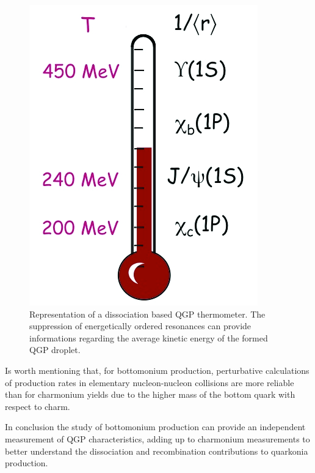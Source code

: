 

\begin{figure}[!t]
\begin{center}
\includegraphics[width=0.3\linewidth]{Chapters/Analysis/Figs/QGP_thermometer.png}
\caption{Representation of a dissociation based QGP thermometer. The suppression of energetically ordered resonances can provide informations regarding the average kinetic energy of the formed QGP droplet.}
\label{fig:QGP_thermo}
\end{center}
\end{figure}

Is worth mentioning that, for bottomonium production, perturbative calculations of production rates in elementary nucleon-nucleon collisions are more reliable than for charmonium yields due to the higher mass of the bottom quark with respect to charm. 

In conclusion the study of bottomonium production can provide an independent measurement of QGP characteristics, adding up to charmonium measurements to better understand the dissociation and recombination contributions to quarkonia production.

